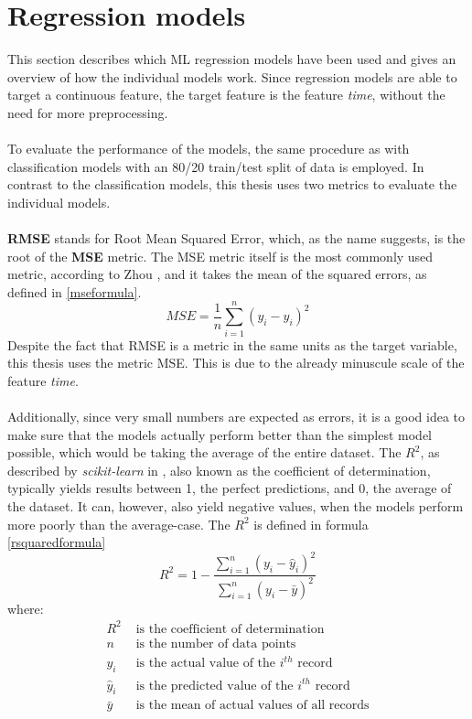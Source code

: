 \section{Regression models}
This section describes which \ac{ML} regression models have been used and gives an overview of how the individual models work. Since regression models are able to target a continuous feature, the target feature is the feature \textit{time}, without the need for more preprocessing.\\\\
To evaluate the performance of the models, the same procedure as with classification models with an 80/20 train/test split of data is employed. In contrast to the classification models, this thesis uses two metrics to evaluate the individual models.
\\\\
\textbf{RMSE} stands for Root Mean Squared Error, which, as the name suggests, is the root of the \textbf{MSE} metric. The MSE metric itself is the most commonly used metric, according to Zhou \parencite{zhou2021machine}, and it takes the mean of the squared errors, as defined in \ref{mseformula}. 
\begin{equation}\label{mseformula}
MSE = \frac{1}{n} \sum_{i=1}^{n} (y_i - \hat{y}_i)^2
\end{equation}
Despite the fact that RMSE is a metric in the same units as the target variable, this thesis uses the metric MSE. This is due to the already minuscule scale of the feature \textit{time}. 
\\\\
Additionally, since very small numbers are expected as errors, it is a good idea to make sure that the models actually perform better than the simplest model possible, which would be taking the average of the entire dataset. The \textbf{$R^2$}, as described by \textit{scikit-learn} in \parencite{sklearnm99:online}, also known as the coefficient of determination, typically yields results between 1, the perfect predictions, and 0, the average of the dataset. It can, however, also yield negative values, when the models perform more poorly than the average-case. The \textbf{$R^2$} is defined in formula \ref{rsquaredformula}
\begin{equation}\label{rsquaredformula}
R^2 = 1 - \frac{\sum_{i=1}^{n} (y_i - \hat{y}_i)^2}{\sum_{i=1}^{n} (y_i - \bar{y})^2}
\end{equation}
where:
\begin{align*}
R^2 & \text{ is the coefficient of determination} \\
n &  \text{ is the number of data points} \\
y_i & \text{ is the actual value of the } i^{th} \text{ record} \\
\hat{y}_i & \text{ is the predicted value of the } i^{th} \text{ record} \\
\bar{y} & \text{ is the mean of actual values of all records}
\end{align*}

